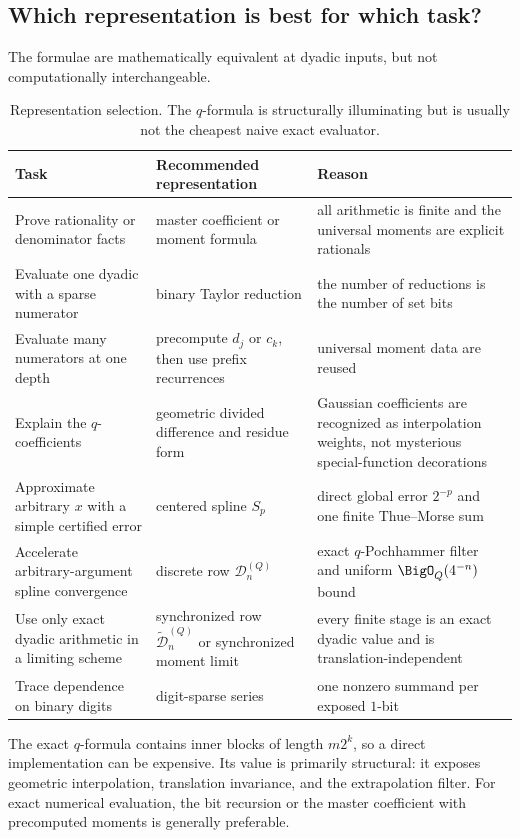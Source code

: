 \documentclass[11pt,oneside]{article}
\theoremstyle{definition}
\theoremstyle{remark}
\begin{document}
\subsection{Which representation is best for which task?}

The formulae are mathematically equivalent at dyadic inputs, but not computationally
interchangeable.

\begin{table}[ht]
\centering
\small
\begin{tabularx}{\textwidth}{@{}p{}p{}X@{}}
\toprule
Task & Recommended representation & Reason \\
\midrule
Prove rationality or denominator facts & master coefficient or moment formula & all arithmetic is finite and the universal moments are explicit rationals \\
Evaluate one dyadic with a sparse numerator & binary Taylor reduction & the number of reductions is the number of set bits \\
Evaluate many numerators at one depth & precompute $d_j$ or $c_k$, then use prefix recurrences & universal moment data are reused \\
Explain the $q$-coefficients & geometric divided difference and residue form & Gaussian coefficients are recognized as interpolation weights, not mysterious special-function decorations \\
Approximate arbitrary $x$ with a simple certified error & centered spline $S_p$ & direct global error $2^{-p}$ and one finite Thue--Morse sum \\
Accelerate arbitrary-argument spline convergence & discrete row $\mathcal D_n^{(Q)}$ & exact $q$-Pochhammer filter and uniform $\BigO_Q(4^{-n})$ bound \\
Use only exact dyadic arithmetic in a limiting scheme & synchronized row $\widetilde{\mathcal D}_n^{(Q)}$ or synchronized moment limit & every finite stage is an exact dyadic value and is translation-independent \\
Trace dependence on binary digits & digit-sparse series & one nonzero summand per exposed $1$-bit \\
\bottomrule
\end{tabularx}
\caption{Representation selection.  The $q$-formula is structurally illuminating but is
usually not the cheapest naive exact evaluator.}
\label{dyadicweb:tab:representation-selection}
\end{table}

The exact $q$-formula contains inner blocks of length $m2^k$, so a direct implementation can
be expensive.  Its value is primarily structural: it exposes geometric interpolation,
translation invariance, and the extrapolation filter.  For exact numerical evaluation, the
bit recursion or the master coefficient with precomputed moments is generally preferable.
\end{document}
